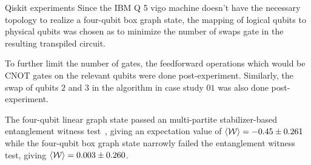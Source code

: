 \documentclass[final]{beamer}
\newlength{\colwidth}
\begin{document}
\begin{frame}[t]
\begin{columns}[t]
\begin{column}{\colwidth}
\begin{block}{Qiskit experiments}
                    Since the IBM Q 5 vigo machine doesn't have the necessary
                    topology to realize a four-qubit box graph state, the
                    mapping of logical qubits to physical qubits was chosen as to minimize the
                    number of swaps gate in the resulting transpiled circuit.

                    To further limit the number of gates, the feedforward
                    operations which would be CNOT gates on the
                    relevant qubits were done post-experiment. Similarly, the swap of
                    qubits $2$ and $3$ in the algorithm in case study $01$ was
                    also done post-experiment.

                    The four-qubit linear graph state passed an multi-partite
                    stabilizer-based entanglement witness
                    test~\cite{PhysRevA.72.022340}, giving an expectation value of
                    $\expval{\mathcal{W}} = -0.45 \pm 0.261$ while the four-qubit
                    box graph state narrowly failed the entanglement witness
                    test, giving $\expval{\mathcal{W}} = 0.003 \pm 0.260$.


\end{block}
\end{column}
\end{columns}
\end{frame}
\end{document}

